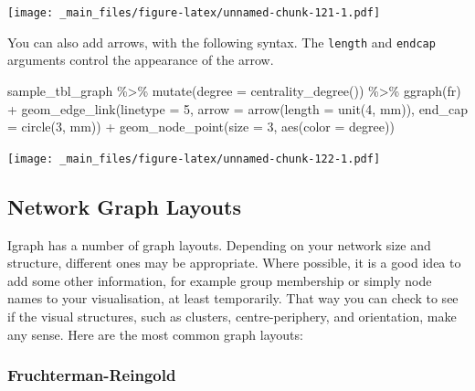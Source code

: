\documentclass[
]{book}
\newenvironment{Shaded}{\begin{snugshade}}{\end{snugshade}}
\newcommand{\AttributeTok}[1]{\textcolor[rgb]{0.77,0.63,0.00}{#1}}
\newcommand{\DecValTok}[1]{\textcolor[rgb]{0.00,0.00,0.81}{#1}}
\newcommand{\FunctionTok}[1]{\textcolor[rgb]{0.00,0.00,0.00}{#1}}
\newcommand{\NormalTok}[1]{#1}
\newcommand{\SpecialCharTok}[1]{\textcolor[rgb]{0.00,0.00,0.00}{#1}}
\newcommand{\StringTok}[1]{\textcolor[rgb]{0.31,0.60,0.02}{#1}}
\begin{document}
\texttt{[image: \_main\_files/figure-latex/unnamed-chunk-121-1.pdf]}

You can also add arrows, with the following syntax. The \texttt{length} and \texttt{endcap} arguments control the appearance of the arrow.

\begin{Shaded}
\begin{Highlighting}[]
\NormalTok{sample\_tbl\_graph }\SpecialCharTok{\%\textgreater{}\%} 
  \FunctionTok{mutate}\NormalTok{(}\AttributeTok{degree =} \FunctionTok{centrality\_degree}\NormalTok{()) }\SpecialCharTok{\%\textgreater{}\%} 
  \FunctionTok{ggraph}\NormalTok{(}\StringTok{\textquotesingle{}fr\textquotesingle{}}\NormalTok{) }\SpecialCharTok{+} 
  \FunctionTok{geom\_edge\_link}\NormalTok{(}\AttributeTok{linetype =} \DecValTok{5}\NormalTok{,}
                 \AttributeTok{arrow =} \FunctionTok{arrow}\NormalTok{(}\AttributeTok{length =} \FunctionTok{unit}\NormalTok{(}\DecValTok{4}\NormalTok{, }\StringTok{\textquotesingle{}mm\textquotesingle{}}\NormalTok{)), }
                   \AttributeTok{end\_cap =} \FunctionTok{circle}\NormalTok{(}\DecValTok{3}\NormalTok{, }\StringTok{\textquotesingle{}mm\textquotesingle{}}\NormalTok{)) }\SpecialCharTok{+} 
  \FunctionTok{geom\_node\_point}\NormalTok{(}\AttributeTok{size =} \DecValTok{3}\NormalTok{, }\FunctionTok{aes}\NormalTok{(}\AttributeTok{color =}\NormalTok{ degree))}
\end{Highlighting}
\end{Shaded}

\texttt{[image: \_main\_files/figure-latex/unnamed-chunk-122-1.pdf]}

\hypertarget{network-graph-layouts}{%
\subsection{Network Graph Layouts}\label{network-graph-layouts}}

Igraph has a number of graph layouts. Depending on your network size and structure, different ones may be appropriate. Where possible, it is a good idea to add some other information, for example group membership or simply node names to your visualisation, at least temporarily. That way you can check to see if the visual structures, such as clusters, centre-periphery, and orientation, make any sense. Here are the most common graph layouts:

\hypertarget{fruchterman-reingold}{%
\subsubsection{Fruchterman-Reingold}\label{fruchterman-reingold}}
\end{document}
